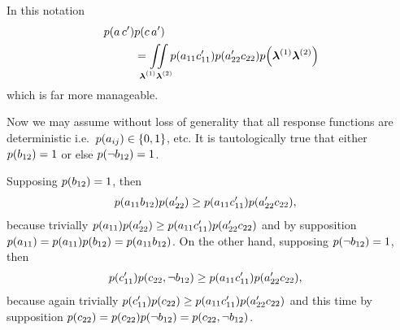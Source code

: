 \begin{EDITING...}
In this notation
\begin{align}\label{eq:quadraticintegral}
\p{a\, c'}&\p{c\, a'}
\\\nonumber&=\iint\limits_{\mathclap{\setlambda^{(1)}\setlambda^{(2)}}}\p{a_{11}c'_{11}}\p{a'_{22}c_{22}}\p{\setlambda^{(1)}\setlambda^{(2)}}
\end{align}
which is far more manageable.




Now we may assume without loss of generality that all response functions are deterministic i.e.~$\p{a_{ij}}\in\brackets{0,1}$, etc. %
It is tautologically true that either $\p{b_{12}}=1$ or else $\p{\nb_{12}}=1$.

Supposing $\p{b_{12}}=1$, then
\begin{align}\begin{split}\label{eq:ifb12}
&\p{a_{11}b_{12}}\p{a'_{22}}\geq \p{a_{11}c'_{11}}\p{a'_{22}c_{22}},
\end{split}\end{align}
because trivially $\p{a_{11}}\p{a'_{22}}\geq \p{a_{11}c'_{11}}\p{a'_{22}c_{22}}$ and by supposition $\p{a_{11}}=\p{a_{11}}\p{b_{12}}=\p{a_{11}b_{12}}$.
%
%
On the other hand, supposing $\p{\nb_{12}}=1$, then
\begin{align}\begin{split}\label{eq:ifnotb12}
&\p{c'_{11}}\p{c_{22},\nb_{12}}\geq \p{a_{11}c'_{11}}\p{a'_{22}c_{22}},
\end{split}\end{align}
because again trivially  $\p{c'_{11}}\p{c_{22}}\geq \p{a_{11}c'_{11}}\p{a'_{22}c_{22}}$ and this time by supposition $\p{c_{22}}=\p{c_{22}}\p{\nb_{12}}=\p{c_{22},\nb_{12}}$.


\end{EDITING...}
